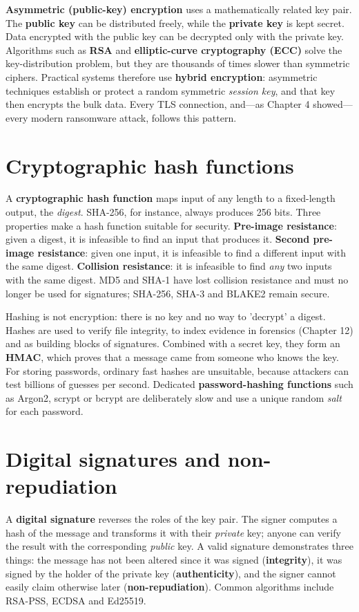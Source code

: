 \documentclass[11pt,openany]{book}
\begin{document}
\textbf{Asymmetric (public-key) encryption} uses a mathematically related key pair. The \textbf{public key} can be distributed freely, while the \textbf{private key} is kept secret. Data encrypted with the public key can be decrypted only with the private key. Algorithms such as \textbf{RSA} and \textbf{elliptic-curve cryptography (ECC)} solve the key-distribution problem, but they are thousands of times slower than symmetric ciphers. Practical systems therefore use \textbf{hybrid encryption}: asymmetric techniques establish or protect a random symmetric \emph{session key}, and that key then encrypts the bulk data. Every TLS connection, and—as Chapter 4 showed—every modern ransomware attack, follows this pattern.

\section{Cryptographic hash functions}\label{sec:7.2}
A \textbf{cryptographic hash function} maps input of any length to a fixed-length output, the \emph{digest}. SHA-256, for instance, always produces 256 bits. Three properties make a hash function suitable for security. \textbf{Pre-image resistance}: given a digest, it is infeasible to find an input that produces it. \textbf{Second pre-image resistance}: given one input, it is infeasible to find a different input with the same digest. \textbf{Collision resistance}: it is infeasible to find \emph{any} two inputs with the same digest. MD5 and SHA-1 have lost collision resistance and must no longer be used for signatures; SHA-256, SHA-3 and BLAKE2 remain secure.

Hashing is not encryption: there is no key and no way to 'decrypt' a digest. Hashes are used to verify file integrity, to index evidence in forensics (Chapter 12) and as building blocks of signatures. Combined with a secret key, they form an \textbf{HMAC}, which proves that a message came from someone who knows the key. For storing passwords, ordinary fast hashes are unsuitable, because attackers can test billions of guesses per second. Dedicated \textbf{password-hashing functions} such as Argon2, scrypt or bcrypt are deliberately slow and use a unique random \emph{salt} for each password.

\section{Digital signatures and non-repudiation}\label{sec:7.3}
A \textbf{digital signature} reverses the roles of the key pair. The signer computes a hash of the message and transforms it with their \emph{private} key; anyone can verify the result with the corresponding \emph{public} key. A valid signature demonstrates three things: the message has not been altered since it was signed (\textbf{integrity}), it was signed by the holder of the private key (\textbf{authenticity}), and the signer cannot easily claim otherwise later (\textbf{non-repudiation}). Common algorithms include RSA-PSS, ECDSA and Ed25519.
\end{document}
